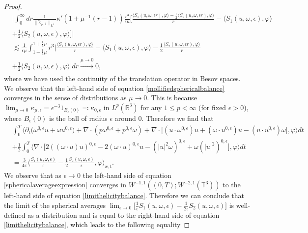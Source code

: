 \documentclass[12pt,a4paper]{article}
\theoremstyle{definition}
\theoremstyle{remark}
\numberwithin{equation}{section}
\begin{document}
\begin{proof}
\begin{align*}
&\bigg\lvert \int_0^\infty dr \frac{1}{\lVert \widetilde{\kappa}_{\mu,1} \rVert_{L^1}} \kappa' ( 1 + \mu^{-1} (r -1) ) \frac{r^3}{\epsilon \mu} \bigg[ \frac{\langle S_1 (u,\omega, \epsilon r), \varphi \rangle - \frac{1}{2} \langle S_2 (u,\omega, \epsilon r), \varphi \rangle}{r} - \langle S_1 (u,\omega, \epsilon ), \varphi \rangle \\
&+ \frac{1}{2} \langle S_2 (u,\omega, \epsilon ), \varphi \rangle \bigg] \bigg\rvert \\
&\lesssim \frac{1}{\epsilon \mu} \int_{1 - \frac{1}{4} \mu}^{1 + \frac{1}{4} \mu} r^3 \bigg\lvert \frac{\langle S_1 (u,\omega, \epsilon r), \varphi \rangle}{r} - \langle S_1 (u,\omega, \epsilon), \varphi \rangle - \frac{1}{2} \frac{\langle S_2 (u,\omega, \epsilon r), \varphi \rangle}{r} \\
&+ \frac{1}{2} \langle S_2 (u,\omega, \epsilon), \varphi \rangle \bigg\rvert dr \xrightarrow[]{\mu \rightarrow 0} 0,
\end{align*}
where we have used the continuity of the translation operator in Besov spaces. We observe that the left-hand side of equation \eqref{mollifiedsphericalbalance} converges in the sense of distributions as $\mu \rightarrow 0$. This is because $\lim_{\mu \rightarrow 0} \kappa_{\mu,\epsilon} = \epsilon^{-3} 1_{B_\epsilon (0)} \eqqcolon \kappa_{0,\epsilon}$ in $L^p (\mathbb{R}^3)$ for any $1 \leq p < \infty$ (for fixed $\epsilon > 0$), where $B_\epsilon (0)$ is the ball of radius $\epsilon$ around $0$. Therefore we find that
\begin{align}
&\int_0^T \bigg\langle \partial_t \big( \omega^{0,\epsilon} u + \omega u^{0,\epsilon} \big) + \nabla \cdot (p \omega^{0,\epsilon} + p^{0,\epsilon} \omega) + \nabla \cdot \big[ (u \cdot \omega^{0,\epsilon}) u + (\omega \cdot u^{0,\epsilon}) u - (u \cdot u^{0,\epsilon}) \omega \big], \varphi \bigg\rangle dt \nonumber \\
&+ \frac{1}{2} \int_0^T \bigg\langle \nabla \cdot \big[ 2((\omega \cdot u) u)^{0,\epsilon} - 2(\omega \cdot u)^{0,\epsilon} u - ( \lvert u \rvert^2 \omega)^{0,\epsilon} + \omega (\lvert u \rvert^2)^{0,\epsilon} \big], \varphi \bigg\rangle dt \nonumber \\
&= \frac{3}{4 \pi} \bigg\langle \frac{S_1 (u,\omega,\epsilon)}{\epsilon} - \frac{1}{2} \frac{S_2 (u,\omega,\epsilon)}{\epsilon} , \varphi \bigg\rangle_{x,t}. \label{sphericalaverageexpression}
\end{align}
We observe that as $\epsilon \rightarrow 0$ the left-hand side of equation \eqref{sphericalaverageexpression} converges in $W^{-1,1} ((0,T); W^{-2,1} (\mathbb{T}^3))$ to the left-hand side of equation \eqref{limithelicitybalance}. Therefore we can conclude that the limit of the spherical averages $\lim_{\epsilon \rightarrow 0} \bigg[ \frac{1}{\epsilon} S_1 (u,\omega,\epsilon) - \frac{1}{2 \epsilon} S_2 (u,\omega,\epsilon) \bigg]$ is well-defined as a distribution and is equal to the right-hand side of equation \eqref{limithelicitybalance}, which leads to the following equality

\end{proof}
\end{document}
